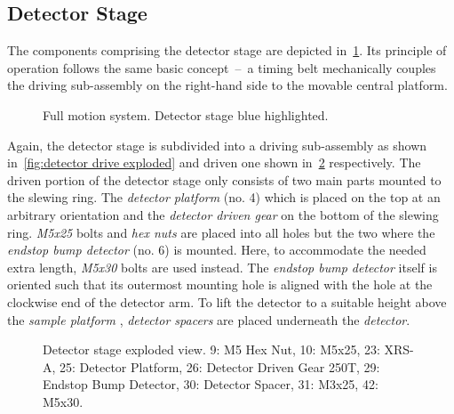         \subsection{Detector Stage}\label{sec:detector stage}
            The components comprising the detector stage are depicted in~\cref{fig:xmagix full detector highlightes}.
            Its principle of operation follows the same basic concept~--~a timing belt mechanically couples the driving sub-assembly on the right-hand side to the movable central platform.
            \begin{figure}[ht]
                \centering
                \caption[Full motion system. Detector stage blue highlighted.]{Full motion system. Detector stage blue highlighted.}%
                \label{fig:xmagix full detector highlightes}%
            \end{figure}

            Again, the detector stage is subdivided into a driving sub-assembly as shown in~\cref{fig:detector drive exploded} and driven one shown in~\cref{fig:detector stage exploded} respectively.
            The driven portion of the detector stage only consists of two main parts mounted to the slewing ring.
            The \textit{detector platform} (no. 4) which is placed on the top at an arbitrary orientation and the \textit{detector driven gear} on the bottom of the slewing ring.
            \textit{M5x25} bolts and \textit{hex nuts} are placed into all holes but the two where the \textit{endstop bump detector} (no. 6) is mounted.
            Here, to accommodate the needed extra length, \textit{M5x30} bolts are used instead.
            The \textit{endstop bump detector} itself is oriented such that its outermost mounting hole is aligned with the hole at the clockwise end of the detector arm.
            To lift the detector to a suitable height above the \textit{sample platform }, \textit{detector spacers} are placed underneath the \textit{detector}.\par\medskip
            \begin{figure}[t]
                \centering
                \caption[Detector stage exploded view.]{Detector stage exploded view. 9: M5 Hex Nut, 10: M5x25, 23: XRS-A, 25: Detector Platform, 26: Detector Driven Gear 250T, 29: Endstop Bump Detector, 30: Detector Spacer, 31: M3x25, 42: M5x30.}%
                \label{fig:detector stage exploded}%
            \end{figure}
            

